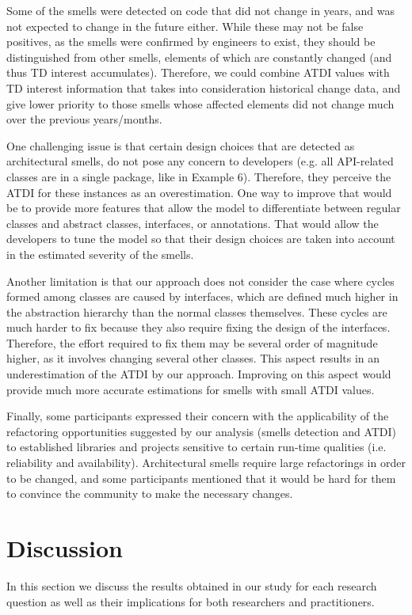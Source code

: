 Some of the smells were detected on code that did not change in years, and was not expected to change in the future either. 
While these may not be false positives, as the smells were confirmed by engineers to exist, they should be distinguished from other smells, elements of which are constantly changed (and thus TD interest accumulates).
Therefore, we could combine ATDI values with TD interest information that takes into consideration historical change data, and give lower priority to those smells whose affected elements did not change much over the previous years/months.

One challenging issue is that certain design choices that are detected as architectural smells, do not pose any concern to developers (e.g. all API-related classes are in a single package, like in Example 6).
Therefore, they perceive the ATDI for these instances as an overestimation.
One way to improve that would be to provide more features that allow the model to differentiate between regular classes and abstract classes, interfaces, or annotations. That would allow the developers to tune the model so that their design choices are taken into account in the estimated severity of the smells.

Another limitation is that our approach does not consider the case where cycles formed among classes are caused by interfaces, which are defined much higher in the abstraction hierarchy than the normal classes themselves.
These cycles are much harder to fix because they also require fixing the design of the interfaces. Therefore, the effort required to fix them may be several order of magnitude higher, as it involves changing several other classes.
This aspect results in an underestimation of the ATDI by our approach.
Improving on this aspect would provide much more accurate estimations for smells with small ATDI values.

Finally, some participants expressed their concern with the applicability of the refactoring opportunities suggested by our analysis (smells detection and ATDI) to established libraries and projects sensitive to certain run-time qualities (i.e. reliability and availability).
Architectural smells require large refactorings in order to be changed, and some participants mentioned that it would be hard for them to convince the community to make the necessary changes.


\section{Discussion}\label{c6:sec:discussion}
In this section we discuss the results obtained in our study for each research question as well as their implications for both researchers and practitioners.

